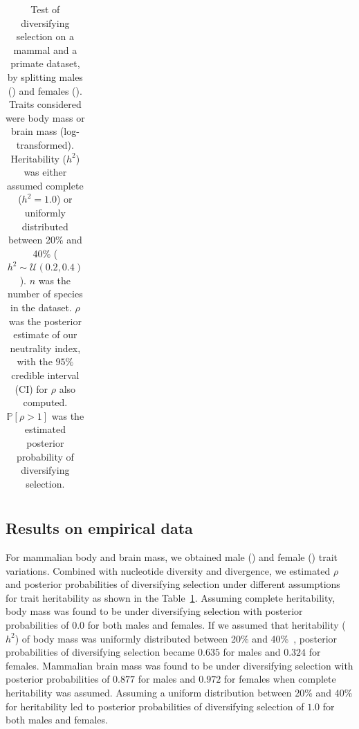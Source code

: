 \documentclass{article}
\newcommand{\proba}{\mathbb{P}}
\newcommand{\NbrTaxa}{n}
\newcommand{\Heritability}{h^2}
\newcommand{\NI}{\rho}
\begin{document}
\begin{table}[t!]
\begin{adjustbox}{width = 0.75\textwidth}
\begin{tabular}{||l|l|l|c|c|c|c|c||}
        \bottomrule
        \end{tabular}
    \end{adjustbox}
    \caption{
    Test of diversifying selection on a mammal and a primate dataset, by splitting males (\Male) and females (\Female).
    Traits considered were body mass or brain mass (log-transformed).
    Heritability ($\Heritability$) was either assumed complete ($\Heritability=1.0$) or uniformly distributed between 20\% and 40\%  ($\Heritability \sim \mathcal{U}(0.2, 0.4)$).
    $\NbrTaxa$ was the number of species in the dataset.
    $\NI$ was the posterior estimate of our neutrality index, with the $95\%$ credible interval (CI) for $\NI$ also computed.
    $\proba [\NI > 1 ]$ was the estimated posterior probability of diversifying selection.
    }
    \label{table:empirical}
\end{table}

\subsection*{Results on empirical data}\label{subsec:results-on-empirical-data}

For mammalian body and brain mass, we obtained male (\Male) and female (\Female) trait variations.
Combined with nucleotide diversity and divergence, we estimated $\NI$ and posterior probabilities of diversifying selection under different assumptions for trait heritability as shown in the Table~\ref{table:empirical}.
Assuming complete heritability, body mass was found to be under diversifying selection with posterior probabilities of $0.0$ for both males and females.
If we assumed that heritability ($\Heritability$) of body mass was uniformly distributed between 20\% and 40\%~\citep{hu_bringing_2022}, posterior probabilities of diversifying selection became $0.635$ for males and $0.324$ for females.
Mammalian brain mass was found to be under diversifying selection with posterior probabilities of $0.877$ for males and $0.972$ for females when complete heritability was assumed.
Assuming a uniform distribution between 20\% and 40\% for heritability led to posterior probabilities of diversifying selection of $1.0$ for both males and females.
\end{document}
